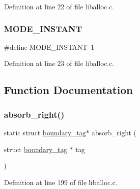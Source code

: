 Definition at line 22 of file liballoc.\+c.

\mbox{\label{a00035_aedc513524290b468e893e1bc4f5cba2f_aedc513524290b468e893e1bc4f5cba2f}} 
\subsubsection{\texorpdfstring{M\+O\+D\+E\+\_\+\+I\+N\+S\+T\+A\+NT}{MODE\_INSTANT}}
{\footnotesize\ttfamily \#define M\+O\+D\+E\+\_\+\+I\+N\+S\+T\+A\+NT~1}



Definition at line 23 of file liballoc.\+c.



\subsection{Function Documentation}
\mbox{\label{a00035_a9d9646746f3401f7c03ff66cba7315c8_a9d9646746f3401f7c03ff66cba7315c8}} 
\subsubsection{\texorpdfstring{absorb\+\_\+right()}{absorb\_right()}}
{\footnotesize\ttfamily static struct \hyperlink{a00126}{boundary\+\_\+tag}$\ast$ absorb\+\_\+right (\begin{DoxyParamCaption}\item[{struct \hyperlink{a00126}{boundary\+\_\+tag} $\ast$}]{tag }\end{DoxyParamCaption})\hspace{0.3cm}{\ttfamily [static]}}



Definition at line 199 of file liballoc.\+c.



